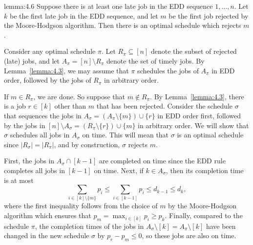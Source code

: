 \begin{lemma}{lemma:4.6}
    Suppose there is at least one late job in the EDD sequence $1, \dots, n$. 
    Let $k$ be the first late job in the EDD sequence, and let $m$ be the first 
    job rejected by the Moore-Hodgson algorithm. Then there is an optimal 
    schedule which rejects $m$. 
\end{lemma}
\begin{pf}
    Consider any optimal schedule $\pi$. Let $R_\pi \subseteq [n]$ denote 
    the subset of rejected (late) jobs, and let $A_\pi = [n] \setminus R_\pi$ 
    denote the set of timely jobs. By Lemma~\ref{lemma:4.3}, we may assume that 
    $\pi$ schedules the jobs of $A_\pi$ in EDD order, followed by the 
    jobs of $R_\pi$ in arbitrary order. 

    If $m \in R_\pi$, we are done. So suppose that $m \notin R_\pi$. 
    By Lemma~\ref{lemma:4.3}, there is a job $r \in [k]$ other than $m$ 
    that has been rejected. Consider the schedule $\sigma$ that sequences 
    the jobs in $A_\sigma = (A_\pi \setminus \{m\}) \cup \{r\}$ in EDD 
    order first, followed by the jobs in $[n] \setminus A_\sigma = 
    (R_\pi \setminus \{r\}) \cup \{m\}$ in arbitrary order. We will show that 
    $\sigma$ schedules all jobs in $A_\sigma$ on time. This will mean that 
    $\sigma$ is an optimal schedule since $|R_\sigma| = |R_\pi|$, 
    and by construction, $\sigma$ rejects $m$.

    First, the jobs in $A_\sigma \cap [k-1]$ are completed on time 
    since the EDD rule completes all jobs in $[k-1]$ on time. Next, 
    if $k \in A_\sigma$, then its completion time is at most 
    \[ \sum_{i\in[k] \setminus \{m\}} p_i \leq 
    \sum_{i\in[k-1]} p_i \leq d_{k-1} \leq d_k, \] 
    where the first inequality follows from the choice of $m$ by the 
    Moore-Hodgson algorithm which ensures that $p_m = 
    \max_{i\in[k]} p_i \geq p_k$. Finally, compared to the schedule $\pi$, 
    the completion times of the jobs in $A_\sigma \setminus [k] = 
    A_\pi \setminus [k]$ have been changed in the new schedule $\sigma$
    by $p_r - p_m \leq 0$, so these jobs are also on time. 
\end{pf}
 
